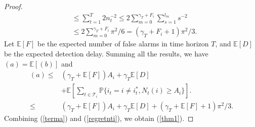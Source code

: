 \documentclass[letterpaper]{article} %
\begin{document}
\begin{proof}
\begin{align}
&\leq\sum_{t=1}^T2n_t^{-2}\leq 2\sum_{m=0}^{\gamma_T+F_i}\sum_{s=1}^{l_m}s^{-2}\\
&\leq2\sum_{m=0}^{\gamma_T+F_i}\pi^2/6=(\gamma_T+F_i+1)\pi^2/3.
\end{align}
Let $\mathbb{E}[F]$ be the expected number of false alarms in time horizon $T$, and $\mathbb{E}[D]$ be the expected detection delay. Summing all the results, we have $(a)=\mathbb{E}[(b)]$ and
\begin{align}\nonumber
(a)\leq&(\gamma_T+\mathbb{E}[F])A_i+{\gamma_T}\mathbb{E}[D]\\\label{terma}
&+\mathbb{E}\left[\sum_{t\in\mathcal{T}_i}\mathbb{P}{\{i_t=i\neq i^*_t,N_t(i)\geq A_i\}}\right].\\\nonumber
\leq&(\gamma_T+\mathbb{E}[F])A_i+{\gamma_T}\mathbb{E}[D]+(\gamma_T+\mathbb{E}[F]+1)\pi^2/3.
\end{align}
Combining (\ref{terma}) and (\ref{regretnti}), we obtain (\ref{thm1}).
\end{proof}
\end{document}
